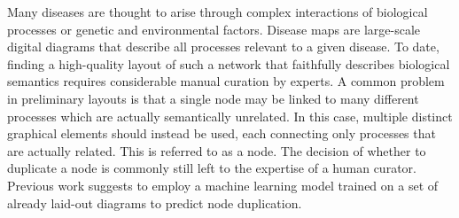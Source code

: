 \documentclass[
	fontsize=10pt, %
	twoside=true, %
	secnumdepth=1, %
  toc=indentunnumbered %
]{kaobook}
\begin{document}
Many diseases are thought to arise through complex interactions of biological
processes or genetic and environmental factors.
%
Disease maps are large-scale digital diagrams that describe all processes
relevant to a given disease.
%
To date, finding a high-quality layout of such a network that faithfully
describes biological semantics requires considerable manual curation by experts.
A common problem in preliminary layouts is that a single node may be
linked to many different processes which are actually semantically unrelated.
In this case, multiple distinct graphical elements should instead be used, each connecting
only processes that are actually related. This is referred to as
 a node.
%
The decision of whether to duplicate a node is commonly still left to the
expertise of a human curator. Previous work
suggests to employ a machine learning
model trained on a set of already laid-out diagrams to predict node duplication.
\end{document}

